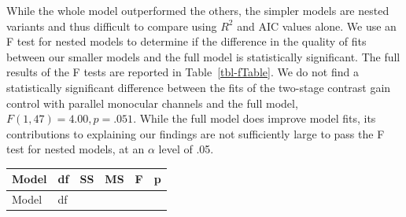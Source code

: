 \documentclass[
  12pt,
]{article}
\begin{document}
While the whole model outperformed the others, the simpler models are
nested variants and thus difficult to compare using \(R^2\) and AIC
values alone. We use an F test for nested models to determine if the
difference in the quality of fits between our smaller models and the
full model is statistically significant. The full results of the F tests
are reported in Table~\ref{tbl-fTable}. We do not find a statistically
significant difference between the fits of the two-stage contrast gain
control with parallel monocular channels and the full model,
\(F(1,47) = 4.00, p = .051\). While the full model does improve model
fits, its contributions to explaining our findings are not sufficiently
large to pass the F test for nested models, at an \(\alpha\) level of
.05.

\begin{longtable}[]{@{}
  >{\raggedright\arraybackslash}p{}
  >{\centering\arraybackslash}p{}
  >{\centering\arraybackslash}p{}
  >{\centering\arraybackslash}p{}
  >{\centering\arraybackslash}p{}
  >{\centering\arraybackslash}p{}@{}}
\toprule\noalign{}
\begin{minipage}[b]{\linewidth}\raggedright
Model
\end{minipage} & \begin{minipage}[b]{\linewidth}\centering
df
\end{minipage} & \begin{minipage}[b]{\linewidth}\centering
SS
\end{minipage} & \begin{minipage}[b]{\linewidth}\centering
MS
\end{minipage} & \begin{minipage}[b]{\linewidth}\centering
F
\end{minipage} & \begin{minipage}[b]{\linewidth}\centering
p
\end{minipage} \\
\midrule\noalign{}
\endfirsthead
\toprule\noalign{}
\begin{minipage}[b]{\linewidth}\raggedright
Model
\end{minipage} & \begin{minipage}[b]{\linewidth}\centering
df
\end{minipage} & \begin{minipage}[b]{\linewidth}\centering

\end{minipage}
\end{longtable}
\end{document}
